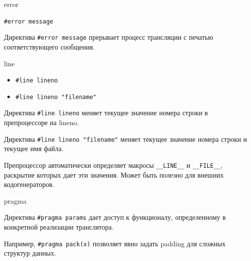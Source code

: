 \documentclass[unknownkeysallowed,xcolor=table]{beamer}
\begin{document}
\begin{frame}[fragile]{error}

\lstinline{#error message}

\vspace{2em}

Директива \lstinline{#error message} прерывает процесс трансляции с печатью соответствующего сообщения.

\end{frame}

\begin{frame}[fragile]{line}

\begin{itemize}
  \item \lstinline{#line lineno}
  \item \lstinline{#line lineno "filename"}
\end{itemize}

\vspace{2em}

Директива \lstinline{#line lineno} меняет текущее значение номера строки в препроцессоре на lineno.

\vspace{0.5em}

Директива \lstinline{#line lineno "filename"} меняет текущее значение номера строки и текущее имя файла.

\vspace{1em}

Препроцессор автоматически определяет макросы \lstinline{__LINE__} и \lstinline{__FILE__}, раскрытие которых дает эти значения.
Может быть полезно для внешних кодогенераторов.

\end{frame}

\begin{frame}[fragile]{pragma}

Директива \lstinline{#pragma params} дает доступ к функционалу, определенному в конкретной реализации транслятора.

\vspace{1em}

Например, \lstinline{#pragma pack(x)} позволяет явно задать padding для сложных структур данных.

\end{frame}
\end{document}
